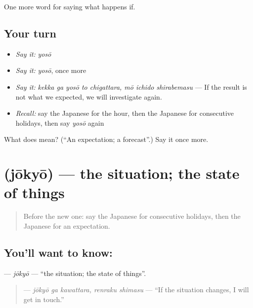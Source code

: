 \begin{grammarlens}[title={What you've built}]
One more word for saying what happens if.
\end{grammarlens}

\subsection*{Your turn}
\begin{itemize}
\raggedright
  \item \emph{Say it:} \emph{yosō}
  \item \emph{Say it:} \emph{yosō}, once more
  \item \emph{Say it:} \emph{kekka ga yosō to chigattara, mō ichido shirabemasu} — If the result is not what we expected, we will investigate again.
  \item \emph{Recall:} say the Japanese for the hour, then the Japanese for consecutive holidays, then say \emph{yosō} again
\end{itemize}

\begin{tcolorbox}[breakable,colback=teal!4,colframe=teal!35!black,title={Before you move on}]
What does  mean? (\textquotedblleft{}An expectation; a forecast\textquotedblright{}.) Say it once more.
\end{tcolorbox}
\section[\texorpdfstring{\ja{じょうきょう} (jōkyō)}{じょうきょう (jōkyō)}]{ (jōkyō) — the situation; the state of things}

\label{lesson:JA-C349-joukyou}



\begin{quote}
Before the new one: say the Japanese for consecutive holidays, then the Japanese for an expectation.
\end{quote}

\subsection*{You'll want to know: }
\textbf{} — \emph{jōkyō} — \textquotedblleft{}the situation; the state of things\textquotedblright{}.

\begin{quote}
\textbf{ } — \emph{jōkyō ga kawattara, renraku shimasu} — \textquotedblleft{}If the situation changes, I will get in touch.\textquotedblright{}
\end{quote}

